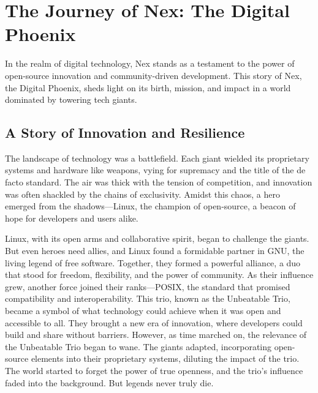 \section{The Journey of Nex: The Digital Phoenix}
\label{sec:journey}
In the realm of digital technology, Nex stands as a testament to the power of open-source innovation and community-driven development.
This story of Nex, the Digital Phoenix, sheds light on its birth, mission, and impact in a world dominated by towering tech giants.

\subsection{A Story of Innovation and Resilience}
\label{sec:journey:sub:innovation}
The landscape of technology was a battlefield.
Each giant wielded its proprietary systems and hardware like weapons, vying for supremacy and the title of the de facto standard.
The air was thick with the tension of competition, and innovation was often shackled by the chains of exclusivity.
Amidst this chaos, a hero emerged from the shadows—Linux, the champion of open-source, a beacon of hope for developers and users alike.

Linux, with its open arms and collaborative spirit, began to challenge the giants.
But even heroes need allies, and Linux found a formidable partner in GNU, the living legend of free software.
Together, they formed a powerful alliance, a duo that stood for freedom, flexibility, and the power of community.
As their influence grew, another force joined their ranks—POSIX, the standard that promised compatibility and interoperability.
This trio, known as the Unbeatable Trio, became a symbol of what technology could achieve when it was open and accessible to all.
They brought a new era of innovation, where developers could build and share without barriers.
However, as time marched on, the relevance of the Unbeatable Trio began to wane. The giants adapted, incorporating open-source elements into their proprietary systems, diluting the impact of the trio.
The world started to forget the power of true openness, and the trio's influence faded into the background.
But legends never truly die.

